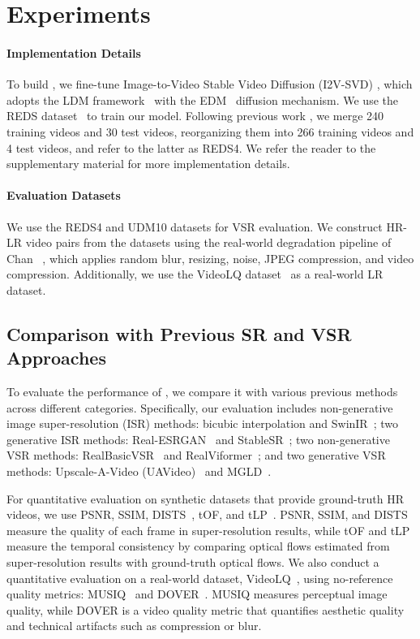 \section{Experiments}
\paragraph{Implementation Details}
To build \ours{}, we fine-tune Image-to-Video Stable Video Diffusion (I2V-SVD) \cite{svd}, which adopts the LDM framework~\cite{ldm} with the EDM~\cite{edm} diffusion mechanism.
We use the REDS dataset~\cite{reds} to train our model. Following previous work \cite{chan2022investigating,yang2023mgldvsr}, we merge 240 training videos and 30 test videos, reorganizing them into 266 training videos and 4 test videos, and refer to the latter as REDS4.
We refer the reader to the supplementary material for more implementation details.

\paragraph{Evaluation Datasets}
We use the REDS4 and UDM10 \cite{udm10} datasets for VSR evaluation.
We construct HR-LR video pairs from the datasets using the real-world degradation pipeline of Chan \etal~, which applies random blur, resizing, noise, JPEG compression, and video compression.
Additionally, we use the VideoLQ dataset~\cite{chan2022investigating} as a real-world LR dataset.


\subsection{Comparison with Previous SR and VSR Approaches}
To evaluate the performance of {\ours}, we compare it with various previous methods across different categories.
Specifically, our evaluation includes non-generative image super-resolution (ISR) methods: bicubic interpolation and SwinIR~\cite{liang2021swinir}; two generative ISR methods: Real-ESRGAN~\cite{real-esrgan} and StableSR~\cite{stablesr}; two non-generative VSR methods: RealBasicVSR~\cite{chan2022investigating} and RealViformer~\cite{realviformer}; and two generative VSR methods: Upscale-A-Video (UAVideo)~\cite{zhou2024upscaleavideo} and MGLD~\cite{yang2023mgldvsr}.

For quantitative evaluation on synthetic datasets that provide ground-truth HR videos, we use PSNR, SSIM, DISTS~\cite{dists}, tOF, and tLP~\cite{tOFtLP}.
PSNR, SSIM, and DISTS measure the quality of each frame in super-resolution results, while tOF and tLP measure the temporal consistency by comparing optical flows estimated from super-resolution results with ground-truth optical flows.
We also conduct a quantitative evaluation on a real-world dataset, VideoLQ~\cite{chan2022investigating}, using no-reference quality metrics: MUSIQ~\cite{musiq} and DOVER~\cite{dover}.
MUSIQ measures perceptual image quality, while DOVER is a video quality metric that quantifies aesthetic quality and technical artifacts such as compression or blur.

